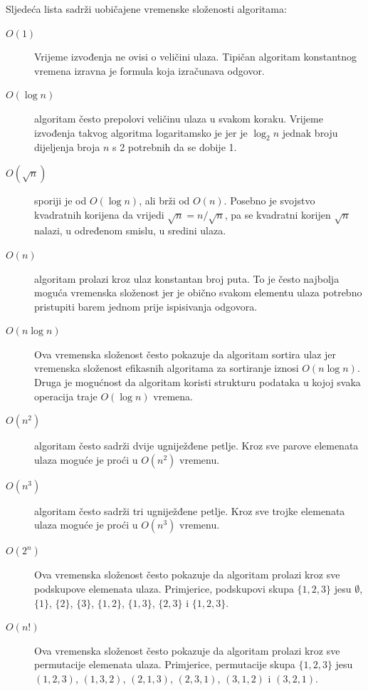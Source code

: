 Sljedeća lista sadrži uobičajene vremenske složenosti
algoritama:

\begin{description}
\item[$O(1)$]
Vrijeme izvođenja 
ne ovisi o veličini ulaza.
Tipičan algoritam konstantnog vremena izravna je
formula koja izračunava odgovor.

\item[$O(\log n)$]
 algoritam često prepolovi
veličinu ulaza u svakom koraku.
Vrijeme izvođenja takvog algoritma
logaritamsko je jer je
$\log_2 n$ jednak broju dijeljenja
broja $n$ s 2 potrebnih da se dobije 1.

\item[$O(\sqrt n)$]
 sporiji je od
$O(\log n)$, ali brži od $O(n)$.
Posebno je svojstvo kvadratnih korijena da vrijedi
$\sqrt n = n/\sqrt n$, pa se kvadratni korijen $\sqrt n$ nalazi,
u određenom smislu, u sredini ulaza.

\item[$O(n)$]
 algoritam prolazi kroz ulaz
konstantan broj puta.
To je često najbolja moguća vremenska složenost
jer je obično svakom
elementu ulaza potrebno pristupiti barem jednom prije
ispisivanja odgovora.

\item[$O(n \log n)$]
Ova vremenska složenost često pokazuje da
algoritam sortira ulaz
jer vremenska složenost efikasnih
algoritama za sortiranje iznosi $O(n \log n)$.
Druga je mogućnost da algoritam
koristi strukturu podataka u kojoj svaka operacija
traje $O(\log n)$ vremena.

\item[$O(n^2)$]
 algoritam često sadrži
dvije ugniježđene petlje.
Kroz sve parove elemenata
ulaza moguće je proći u $O(n^2)$ vremenu.

\item[$O(n^3)$]
 algoritam često sadrži
tri ugniježđene petlje.
Kroz sve trojke elemenata
ulaza moguće je proći u $O(n^3)$ vremenu.

\item[$O(2^n)$]
Ova vremenska složenost često pokazuje da
algoritam prolazi kroz sve
podskupove elemenata ulaza.
Primjerice, podskupovi skupa $\{1,2,3\}$ jesu
$\emptyset$, $\{1\}$, $\{2\}$, $\{3\}$, $\{1,2\}$,
$\{1,3\}$, $\{2,3\}$ i $\{1,2,3\}$.

\item[$O(n!)$]
Ova vremenska složenost često pokazuje da
algoritam prolazi kroz sve
permutacije elemenata ulaza.
Primjerice, permutacije skupa $\{1,2,3\}$ jesu
$(1,2,3)$, $(1,3,2)$, $(2,1,3)$, $(2,3,1)$,
$(3,1,2)$ i $(3,2,1)$.

\end{description}

